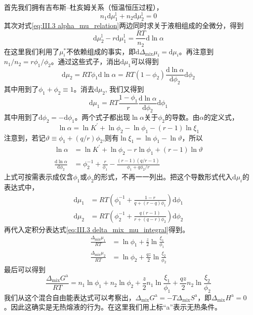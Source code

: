 \documentclass[main.tex]{subfiles}
\begin{document}
首先我们拥有吉布斯--杜亥姆关系（恒温恒压过程），
\[n_1\mathrm{d}\mu_1^\text{l}+n_2\mathrm{d}\mu_2^\text{l}=0\]
其次对式\eqref{eq:III.3 alpha_mu_relation}两边同时求关于液相组成的全微分，得到
\[\mathrm{d}\mu_2^\text{l}-r\mathrm{d}\mu_1^\text{l}=\frac{RT}{n_2}\mathrm{d}\ln\alpha\]
在这里我们利用了$\mu_i^*$不依赖组成的事实，即$\mathrm{d}\Delta_\text{mix}\mu_i=\mathrm{d}\mu_i$。再注意到$n_1/n_2=r\phi_1/\phi_2$。通过这些式子，消出$\mathrm{d}\mu_1$可以得到
\[\mathrm{d}\mu_2=RT\phi_1\mathrm{d}\ln\alpha=RT\left(1-\phi_2\right)\frac{\mathrm{d}\ln\alpha}{\mathrm{d}\phi_2}\mathrm{d}\phi_2\]
其中用到了$\phi_1+\phi_2\equiv 1$。消去$\mathrm{d}\mu_2$, 我们又得到
\[\mathrm{d}\mu_1=RT\frac{1-\phi_1}{r}\frac{\mathrm{d}\ln\alpha}{\mathrm{d}\phi_2}\mathrm{d}\phi_1\]
其中用到了$\mathrm{d}\phi_2=-\mathrm{d}\phi_1$。两个式子都出现$\ln\alpha$关于$\phi_2$的导数。由$\alpha$的定义式，
\[\ln\alpha=\ln K^\prime+\ln\phi_2-\ln\phi_1-\left(r-1\right)\ln\xi_1\]
注意到，若记$\vartheta\equiv\phi_1+\left(q/r\right)\phi_2$,则有$\ln\xi_1=\ln\phi_1-\ln \vartheta$，所以
\begin{align*}
    \ln\alpha                                    & =\ln K^\prime+\ln\phi_2-r\ln\phi_1+\left(r-1\right)\ln\vartheta                           \\
    \frac{\mathrm{d}\ln\alpha}{\mathrm{d}\phi_2} & =\phi_2^{-1}+\frac{r}{\phi_1}-\frac{\left(r-1\right)\left(q/r-1\right)}{\phi_1+q\phi_2/r}
\end{align*}
上式可按需表示成仅含$\phi_1$或$\phi_2$的形式，不再一一列出。把这个导数形式代入$\mathrm{d}\mu_i$的表达式中，
\begin{align*}\mathrm{d}\mu_1 & =RT\left(\phi_1^{-1}+\frac{1-r}{q+\left(r-q\right)\phi_1}\right)\mathrm{d}\phi_1               \\
              \mathrm{d}\mu_2 & =RT\left(\phi_2^{-1}+\frac{q\left(r-1\right)}{r+\left(q-r\right)\phi_2}\right)\mathrm{d}\phi_2
\end{align*}
再代入定积分表达式\eqref{eq:III.3 delta_mix_mu_integral}得到。
\begin{align*}
    \frac{\Delta_\text{mix}\mu_1}{RT} & =\ln\phi_1+\frac{z}{2}\ln\frac{\xi_1}{\phi_1}  \\
    \frac{\Delta_\text{mix}\mu_2}{RT} & =\ln\phi_2+\frac{qz}{2}\ln\frac{\xi_2}{\phi_2}
\end{align*}
最后可以得到
\begin{equation}\label{eq:III.3_athermal_polymer_solution_mixing_gibbs_free_energy}
    \frac{\Delta_\text{mix} G^\text{a}}{RT}=n_1\ln\phi_1+n_2\ln\phi_2+\frac{z}{2}n_1\ln\frac{\xi_1}{\phi_1}+\frac{qz}{2}n_2\ln\frac{\xi_2}{\phi_2}
\end{equation}
我们从这个混合自由能表达式可以考察出，$\Delta_\text{mix}G^\text{a}=-T\Delta_\text{mix}S^\text{a}$，即$\Delta_\text{mix}H^\text{a}=0$。因此这确实是无热熔液的行为。在这里我们用上标“a”表示无热条件。
\end{document}
